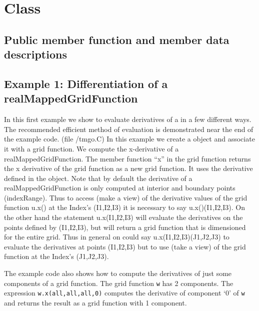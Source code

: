 \section{Class \MGO}


\subsection{Public member function and member data descriptions}







\vfill\eject
\subsection{Example 1: Differentiation of a {\ff realMappedGridFunction}} \label{sec:mgoex}

In this first example we show to evaluate derivatives of a \MGF
in a few different ways. The recommended efficient method of evaluation is
demonstrated near the end of the example code.
(file {\ff \examples /tmgo.C})
{\footnotesize
{}
}
In this example we create a {\ff \MGO} object and associate
it with a grid function. We compute the x-derivative of
a {\ff realMappedGridFunction}.
The member
function ``x'' in the grid function returns the
x derivative of the grid function as a new grid function. 
It uses the derivative
defined in the {\ff \MGO} object. 
Note that by default the derivative of a {\ff realMappedGridFunction} 
is only computed at interior and boundary points (indexRange). Thus to
access (make a view) of the derivative values of the grid function {\ff u.x()} 
at the Index's {\ff (I1,I2,I3)}
it is necessary to say {\ff u.x()(I1,I2,I3)}. On the other hand the statement
{\ff u.x(I1,I2,I3)} will evaluate the derivatives on the points
defined by {\ff (I1,I2,I3)}, but will return a grid function that is dimensioned
for the entire grid. Thus in general on could say {\ff u.x(I1,I2,I3)(J1,J2,J3)}
to evaluate the derivatives at points {\ff (I1,I2,I3)} but to use (take a view)
of the grid function at the Index's {\ff (J1,J2,J3)}. 

The example code also shows how to compute the derivatives of just some components
of a grid function. The grid function {\tt w} has 2 components.
The expression {\tt w.x(all,all,all,0)} computes the derivative
of component `0' of {\tt w} and returns the result as a grid function with 1 component.

